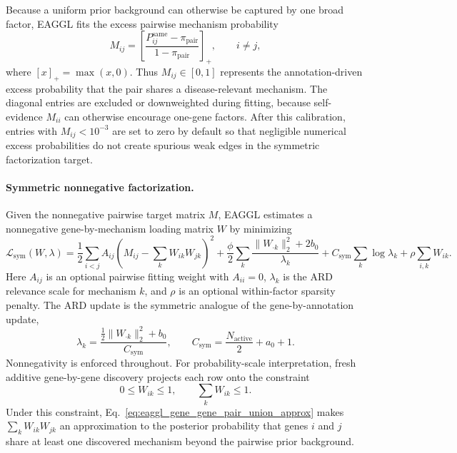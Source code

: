 \documentclass[11pt]{article}
\begin{document}
Because a uniform prior background can otherwise be captured by one broad factor, EAGGL
fits the excess pairwise mechanism probability
\begin{equation}
M_{ij}
= \left[\frac{P_{ij}^{\mathrm{same}} - \pi_{\mathrm{pair}}}{1-\pi_{\mathrm{pair}}}\right]_+,
\qquad i\ne j,
\label{eq:eaggl_gene_gene_excess_probability}
\end{equation}
where $[x]_+=\max(x,0)$. Thus $M_{ij}\in[0,1]$ represents the annotation-driven excess
probability that the pair shares a disease-relevant mechanism. The diagonal entries are
excluded or downweighted during fitting, because self-evidence $M_{ii}$ can otherwise
encourage one-gene factors. After this calibration, entries with $M_{ij}<10^{-3}$ are
set to zero by default so that negligible numerical excess probabilities do not create
spurious weak edges in the symmetric factorization target.

\paragraph{Symmetric nonnegative factorization.}
Given the nonnegative pairwise target matrix $M$, EAGGL estimates a nonnegative
gene-by-mechanism loading matrix $W$ by minimizing
\begin{equation}
\mathcal{L}_{\mathrm{sym}}(W,\lambda)
=
\frac{1}{2}
\sum_{i<j} A_{ij}
\left(
M_{ij} - \sum_k W_{ik}W_{jk}
\right)^2
+
\frac{\phi}{2}
\sum_k
\frac{\|W_{\cdot k}\|_2^2 + 2b_0}{\lambda_k}
+
C_{\mathrm{sym}}\sum_k \log\lambda_k
+
\rho\sum_{i,k} W_{ik}.
\label{eq:eaggl_gene_gene_symnmf_objective}
\end{equation}
Here $A_{ij}$ is an optional pairwise fitting weight with $A_{ii}=0$, $\lambda_k$ is
the ARD relevance scale for mechanism $k$, and $\rho$ is an optional within-factor
sparsity penalty. The ARD update is the symmetric analogue of the gene-by-annotation
update,
\begin{equation}
\lambda_k
=
\frac{\frac{1}{2}\|W_{\cdot k}\|_2^2 + b_0}{C_{\mathrm{sym}}},
\qquad
C_{\mathrm{sym}} = \frac{N_{\mathrm{active}}}{2}+a_0+1.
\label{eq:eaggl_gene_gene_lambda_update}
\end{equation}
Nonnegativity is enforced throughout. For probability-scale interpretation, fresh additive
gene-by-gene discovery projects each row onto the constraint
\begin{equation}
0\le W_{ik}\le 1,
\qquad
\sum_k W_{ik}\le 1.
\label{eq:eaggl_gene_gene_row_sum_constraint}
\end{equation}
Under this constraint, Eq.~\eqref{eq:eaggl_gene_gene_pair_union_approx} makes
$\sum_k W_{ik}W_{jk}$ an approximation to the posterior probability that genes $i$ and
$j$ share at least one discovered mechanism beyond the pairwise prior background.
\end{document}
